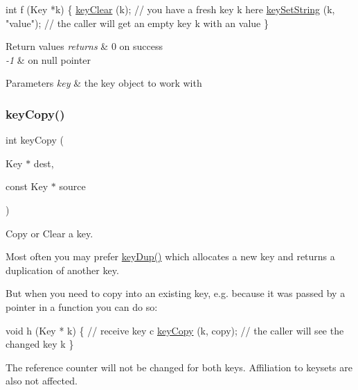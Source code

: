 \begin{DoxyCode}
\textcolor{keywordtype}{int} f (Key *k)
\{
        \hyperlink{group__key_gab2242311a36bbc0520e0d36895107ec1}{keyClear} (k);
        \textcolor{comment}{// you have a fresh key k here}
        \hyperlink{group__keyvalue_ga622bde1eb0e0c4994728331326340ef2}{keySetString} (k, \textcolor{stringliteral}{"value"});
        \textcolor{comment}{// the caller will get an empty key k with an value}
\}
\end{DoxyCode}



\begin{DoxyRetVals}{Return values}
{\em returns} & 0 on success \\
\hline
{\em -\/1} & on null pointer\\
\hline
\end{DoxyRetVals}

\begin{DoxyParams}{Parameters}
{\em key} & the key object to work with \\
\hline
\end{DoxyParams}
\mbox{\label{group__key_ga6a12cbbe656a1ad9f41b8c681d7a2f92}} 
\subsubsection{\texorpdfstring{key\+Copy()}{keyCopy()}}
{\footnotesize\ttfamily int key\+Copy (\begin{DoxyParamCaption}\item[{Key $\ast$}]{dest,  }\item[{const Key $\ast$}]{source }\end{DoxyParamCaption})}



Copy or Clear a key. 

Most often you may prefer \hyperlink{group__key_gae6ec6a60cc4b8c1463fa08623d056ce3}{key\+Dup()} which allocates a new key and returns a duplication of another key.

But when you need to copy into an existing key, e.\+g. because it was passed by a pointer in a function you can do so\+:


\begin{DoxyCodeInclude}
\textcolor{keywordtype}{void} h (Key * k)
\{
        \textcolor{comment}{// receive key c}
        \hyperlink{group__key_ga6a12cbbe656a1ad9f41b8c681d7a2f92}{keyCopy} (k, copy);
        \textcolor{comment}{// the caller will see the changed key k}
\}
\end{DoxyCodeInclude}
 The reference counter will not be changed for both keys. Affiliation to keysets are also not affected.

